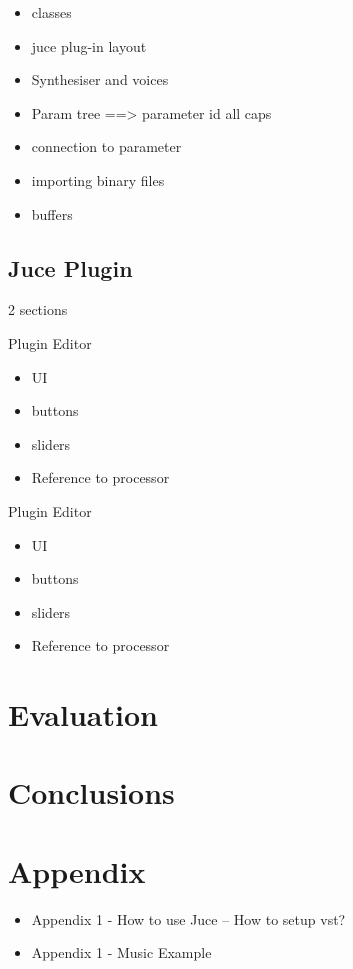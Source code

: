 \documentclass[12pt]{article}
\begin{document}
	\begin{itemize}
		\item classes
		\item juce plug-in layout
		\item Synthesiser and voices
		\item Param tree ==> parameter id all caps
		\item connection to parameter
		\item importing binary files
		\item buffers
	\end{itemize}

	\subsection{Juce Plugin}
	2 sections
	
	Plugin Editor
	\begin{itemize}
		\item UI
		\item buttons
		\item sliders
		\item Reference to processor
	\end{itemize}
	
	
	Plugin Editor
	\begin{itemize}
		\item UI
		\item buttons
		\item sliders
		\item Reference to processor
	\end{itemize}
	
	
	

	
\section{Evaluation}
	
\section{Conclusions}
	
\section{Appendix}
	\begin{itemize}
		\item Appendix 1 - How to use Juce -- How to setup vst?
		\item Appendix 1 - Music Example
	\end{itemize}
\end{document}
